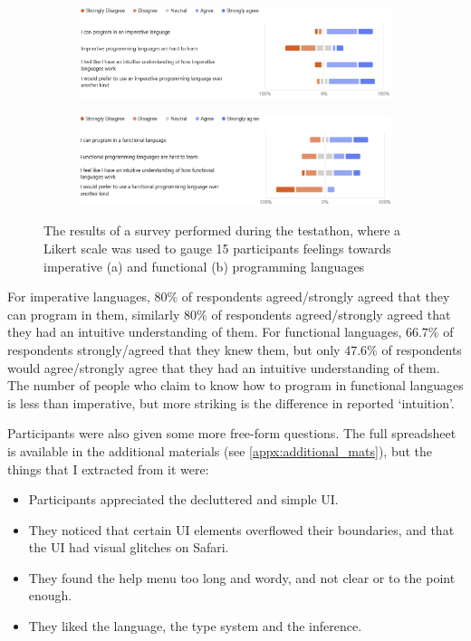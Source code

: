 \begin{figure}[ht]
    \begin{subfigure}{\textwidth}
        \centering
        \includegraphics[width=\linewidth]{images/imperative_likert.png}
        \caption{}
        \label{fig:imp_is_easy}
    \end{subfigure}
    
    \begin{subfigure}{\textwidth}
        \centering
        \includegraphics[width=\linewidth]{images/fp_likert.png}
        \caption{}
        \label{fig:fp_is_hard}
    \end{subfigure}
    \caption{The results of a survey performed during the testathon, where a Likert scale was used to gauge 15 participants feelings towards imperative (a) and functional (b) programming languages}
\end{figure}

For imperative languages, $80\%$ of respondents agreed/strongly agreed that they can program in them, similarly $80\%$ of respondents agreed/strongly agreed that they had an intuitive understanding of them. For functional languages, $66.7\%$ of respondents strongly/agreed that they knew them, but only $47.6\%$ of respondents would agree/strongly agree that they had an intuitive understanding of them. The number of people who claim to know how to program in functional languages is less than imperative, but more striking is the difference in reported `intuition'. 

Participants were also given some more free-form questions. The full spreadsheet is available in the additional materials (see \ref{appx:additional_mats}), but the things that I extracted from it were:
\begin{itemize}
    \item Participants appreciated the decluttered and simple UI. 
    \item They noticed that certain UI elements overflowed their boundaries, and that the UI had visual glitches on Safari.
    \item They found the help menu too long and wordy, and not clear or to the point enough.
    \item They liked the language, the type system and the inference. 
\end{itemize}




